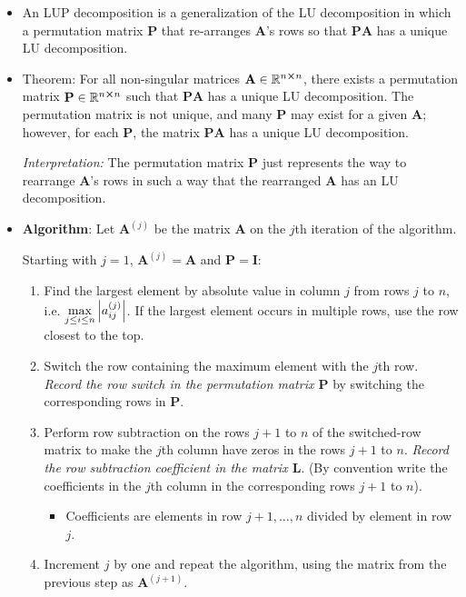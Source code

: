 \documentclass[11pt, a4paper]{article}
\newcommand{\R}{\mathbb{R}} %
\newcommand{\mat}[1]{\mathbf{#1}} %
\begin{document}
\begin{itemize}
	\item An LUP decomposition is a generalization of the LU decomposition in which a permutation matrix $ \mat{P} $ that re-arranges $ \mat{A} $'s rows so that $ \mat{P} \mat{A} $ has a unique LU decomposition.
	
	\item Theorem: For all non-singular matrices $ \mat{A} \in \R^{n \cross n} $, there exists a permutation matrix $ \mat{P}  \in \R^{n \cross n}$ such that $ \mat{P}\mat{A} $ has a unique LU decomposition. The permutation matrix is not unique, and many $ \mat{P} $ may exist for a given $ \mat{A} $; however, for each $ \mat{P} $, the matrix $ \mat{P} \mat{A} $ has a unique LU decomposition.
	
	\textit{Interpretation:}  The permutation matrix $ \mathbf{P} $ just represents the way to rearrange $ \mat{A} $'s rows in such a way that the rearranged $ \mat{A} $ has an LU decomposition.

	\item \textbf{Algorithm}: Let $ \mat{A}^{(j)} $ be the matrix $ \mat{A} $ on the $ j $th iteration of the algorithm.
	
	Starting with $ j = 1 $, $ \mat{A}^{(j)} = \mat{A} $ and $ \mathbf{P} = \mathbf{I} $:
	\begin{enumerate}
		\item Find the largest element by absolute value in column $ j $ from rows $ j $ to $ n $, i.e. $ \displaystyle{\max_{j\leq i\leq n} \abs{a_{ij}^{(j)}}} $. If the largest element occurs in multiple rows, use the row closest to the top.
	
		\item Switch the row containing the maximum element with the $ j $th row. \textit{Record the row switch in the permutation matrix $ \mathbf{P} $} by switching the corresponding rows in $ \mathbf{P} $.
		
		\item Perform row subtraction on the rows $ j + 1 $ to $ n $ of the switched-row matrix to make the $ j $th column have zeros in the rows $ j+1 $ to $ n $. \textit{Record the row subtraction coefficient in the matrix $ \mat{L} $}. (By convention write the coefficients in the $ j $th column in the corresponding rows $ j + 1 $ to $ n $).
		
		\begin{itemize}
			\item Coefficients are elements in row $ j+1, \dots, n $ divided by element in row $ j $.
		\end{itemize}
		
		\item Increment $ j $ by one and repeat the algorithm, using the matrix from the previous step as $ \mat{A}^{(j+1)} $.
	\end{enumerate}
	
	
	
\end{itemize}
\end{document}
